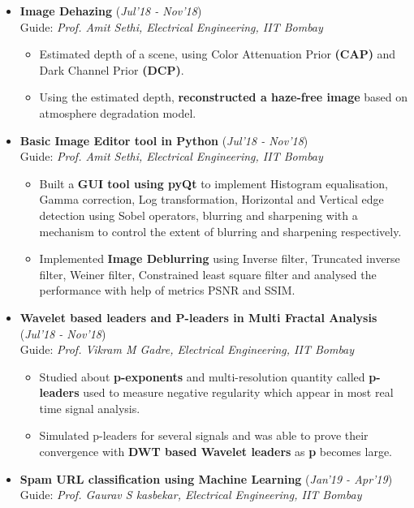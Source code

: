 \documentclass[10pt]{article}
\begin{document}
\begin{itemize}[leftmargin=0.4cm]
\item \textbf{Image Dehazing  } \hfill{(\textit{Jul'18 - Nov'18})}\\
Guide: \textit{Prof. Amit Sethi, Electrical Engineering, IIT Bombay}
	\begin{itemize}
          \item Estimated depth of a scene, using Color Attenuation Prior \textbf{(CAP)} and Dark Channel Prior \textbf{(DCP)}.
	  \item Using the estimated depth, \textbf{reconstructed a haze-free image} based on atmosphere degradation model.
	\end{itemize}
	

\item \textbf{Basic Image Editor tool in Python 
} 
\hfill{(\textit{Jul'18 - Nov'18})}\\
Guide: \textit{Prof. Amit Sethi, Electrical Engineering, IIT Bombay}
	\begin{itemize}
	\item Built a \textbf{GUI tool using pyQt} to implement Histogram equalisation, Gamma correction, Log transformation, Horizontal and Vertical edge detection using Sobel operators, blurring and sharpening with a mechanism to control the extent of blurring and sharpening respectively.
	\item Implemented \textbf{Image Deblurring} using Inverse filter, Truncated inverse filter, Weiner filter, Constrained least square filter and analysed the performance with help of metrics PSNR and SSIM.
	\end{itemize}


\item \textbf{Wavelet based leaders and P-leaders in Multi
Fractal Analysis} 
\hfill{(\textit{Jul'18 - Nov'18})}\\
Guide: \textit{Prof. Vikram M Gadre, Electrical Engineering, IIT Bombay}
	\begin{itemize}
	\item Studied about \textbf{p-exponents} and multi-resolution quantity called \textbf{p-leaders} used to measure negative regularity which appear in most real time signal analysis.
	\item Simulated p-leaders for several signals and was able to prove their convergence with \textbf{DWT based Wavelet leaders} as \textbf{p} becomes large.
	\end{itemize}
	

\item \textbf{Spam URL classification using Machine Learning}
\hfill{(\textit{Jan'19 - Apr'19})}\\
Guide: \textit{Prof. Gaurav S kasbekar, Electrical Engineering, IIT Bombay}


\end{itemize}
\end{document}
